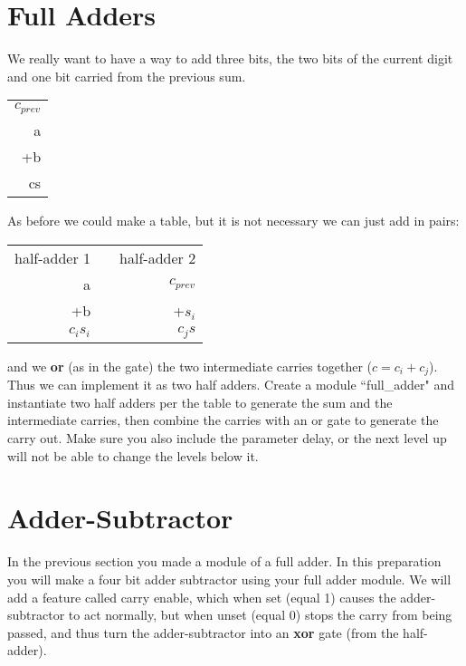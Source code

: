\section{Full Adders}

We really want to have a way to add three bits, the two bits of the current digit and one bit carried from the previous sum.

\begin{tabular}{r}
 $c_{prev}$ \\
 a \\
+b \\ \hline
cs \\
\end{tabular}

As before we could make a table, but it is not necessary we can just add in pairs:

\begin{tabular}{rcr}
half-adder 1 & & half-adder 2 \\
 a           & & $c_{prev}$ \\
+b           & & +$s_i$     \\ \cline{1-1} \cline{3-3}
$c_is_i$     & & $c_js$     \\
\end{tabular}

and we \textbf{or} (as in the gate) the two intermediate carries together ($c=c_i+c_j$).  Thus we can implement it as two half adders.  Create a module ``full\_adder" and instantiate two half adders per the table to generate the sum and the intermediate carries, then combine the carries with an or gate to generate the carry out.  Make sure you also include the parameter delay, or the next level up will not be able to change the levels below it.

\section{Adder-Subtractor}

In the previous section you made a module of a full adder.  In this preparation you will make a four bit adder subtractor using your full adder module.  We will add a feature called carry enable, which when set (equal 1) causes the adder-subtractor to act normally, but when unset (equal 0) stops the carry from being passed, and thus turn the adder-subtractor into an \textbf{xor} gate (from the half-adder).

